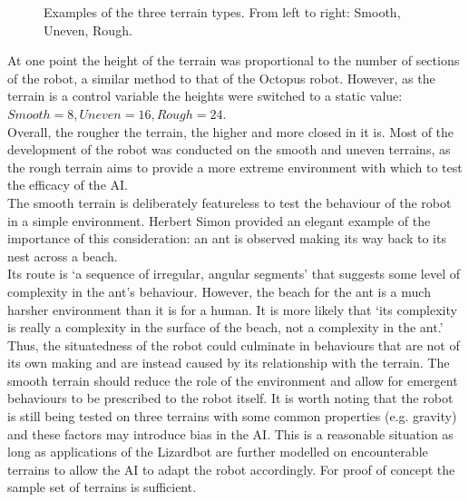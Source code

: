 \documentclass{article}
\begin{document}
\begin{figure}[H]
\caption{Examples of the three terrain types. From left to right: Smooth, Uneven, Rough.}
\end{figure}
At one point the height of the terrain was proportional to the number of sections of the robot, a similar method to that of the Octopus robot. However, as the terrain is a control variable the heights were switched to a static value: $Smooth=8, Uneven=16, Rough=24$.\\
Overall, the rougher the terrain, the higher and more closed in it is. Most of the development of the robot was conducted on the smooth and uneven terrains, as the rough terrain aims to provide a more extreme environment with which to test the efficacy of the AI.\\
The smooth terrain is deliberately featureless to test the behaviour of the robot in a simple environment. Herbert Simon provided an elegant example of the importance of this consideration: an ant is observed making its way back to its nest across a beach.\\
Its route is ‘a sequence of irregular, angular segments’ that suggests some level of complexity in the ant's behaviour. However, the beach for the ant is a much harsher environment than it is for a human. It is more likely that ‘its complexity is really a complexity in the surface of the beach, not a complexity in the ant.’  Thus, the situatedness of the robot could culminate in behaviours that are not of its own making and are instead caused by its relationship with the terrain. The smooth terrain should reduce the role of the environment and allow for emergent behaviours to be prescribed to the robot itself. It is worth noting that the robot is still being tested on three terrains with some common properties (e.g. gravity) and these factors may introduce bias in the AI. This is a reasonable situation as long as applications of the Lizardbot are further modelled on encounterable terrains to allow the AI to adapt the robot accordingly. For proof of concept the sample set of terrains is sufficient.
\end{document}
